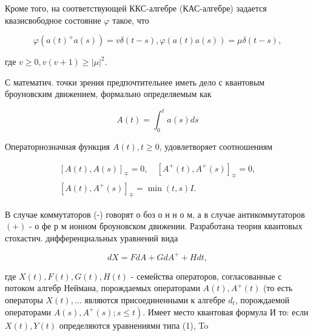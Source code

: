 \documentclass[10pt]{article}
\begin{document}
Кроме того, на соответствующей ККС-алгебре (КАС-алгебре) задается квазисвободное состояние $\varphi$ такое, что



\[

\varphi\left(a(t)^{+} a(s)\right)=v \delta(t-s), \varphi(a(t) a(s))=\mu \delta(t-s),

\]



где $v \geqslant 0, v(v+1) \geqslant|\mu|^{2}$.



С математич. точки зрения предпочтительнее иметь дело с квантовым броуновским движением, формально определяемым как



\[

A(t)=\int_{0}^{t} a(s) d s

\]



Операторнозначная функция $A(t), t \geqslant 0$, удовлетворяет соотношениям



\[

\begin{gathered}

{[A(t), A(s)]_{\mp}=0, \quad\left[A^{+}(t), A^{+}(s)\right]_{\mp}=0,} \\

{\left[A(t), A^{+}(s)\right]_{\mp}=\min (t, s) I .}

\end{gathered}

\]



В случае коммутаторов (-) говорят о боз о н н о м, а в случае антикоммутаторов $(+)$ - о фе р м ионном броуновском движении. Разработана теория квантовых стохастич. дифференциальных уравнений вида



\[

d X=F d A+G d A^{+}+H d t,

\]



где $X(t), F(t), G(t), H(t)$ - семейства операторов, согласованные с потоком алгебр Неймана, порождаемых операторами $A(t), A^{+}(t)$ (то есть операторы $X(t), \ldots$ являются присоединенными к алгебре $d_{t}$, порождаемой операторами $\left.A(s), A^{+}(s) ; s \leqslant t\right)$. Имеет место квантовая формула И то: если $X(t), Y(t)$ определяются уравнениями типа (1), To
\end{document}
